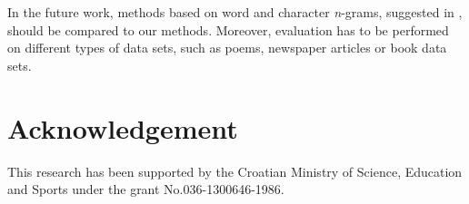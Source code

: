 \documentclass{llncs}
\begin{document}
In the future work, methods based on word and character \emph{n}-grams, suggested
in \cite{keselj2003n,peng2003language,coyotl2006authorship}, should be
compared to our methods. Moreover, evaluation has to be performed on different
types of data sets, such as poems, newspaper articles or book data sets.


\section*{Acknowledgement}
This research has been supported by the Croatian Ministry of Science, Education and Sports under the grant No.036-1300646-1986.



\end{document}
